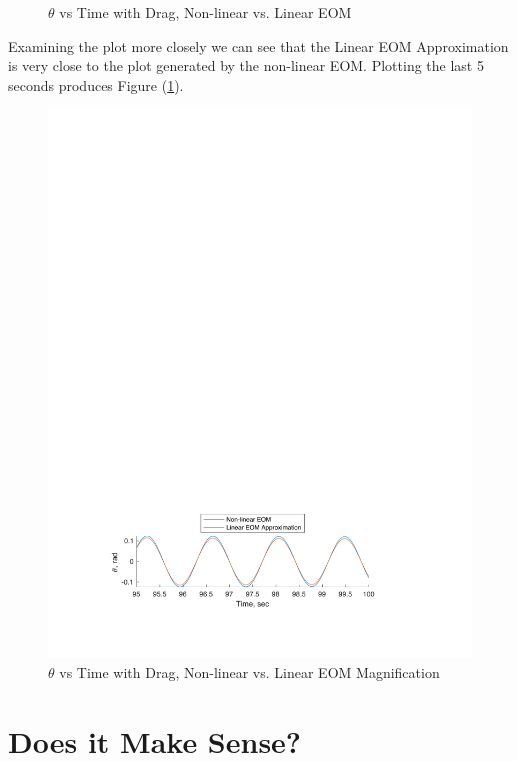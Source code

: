 \documentclass[12pt]{report}
\begin{document}
\begin{flushleft}
\begin{figure}[ht]
  \caption{$\theta$ vs Time with Drag, Non-linear vs. Linear EOM}
\end{figure}
Examining the plot more closely we can see that the Linear EOM Approximation is very close to the plot generated by the non-linear EOM. Plotting the last 5 seconds produces Figure (\ref{fig:timewithdrag}).
\begin{figure}[ht]
  \includegraphics[center]{compareclose}
  \caption{$\theta$ vs Time with Drag, Non-linear vs. Linear EOM Magnification}
  \label{fig:timewithdrag}
\end{figure}
\newpage
\section{Does it Make Sense?}

\end{flushleft}
\end{document}
